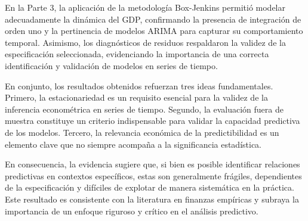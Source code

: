 \documentclass[11pt,a4paper]{article}
\begin{document}
	En la Parte 3, la aplicación de la metodología Box-Jenkins permitió modelar adecuadamente la dinámica del GDP, confirmando la presencia de integración de orden uno y la pertinencia de modelos ARIMA para capturar su comportamiento temporal. Asimismo, los diagnósticos de residuos respaldaron la validez de la especificación seleccionada, evidenciando la importancia de una correcta identificación y validación de modelos en series de tiempo.
	
	En conjunto, los resultados obtenidos refuerzan tres ideas fundamentales. Primero, la estacionariedad es un requisito esencial para la validez de la inferencia econométrica en series de tiempo. Segundo, la evaluación fuera de muestra constituye un criterio indispensable para validar la capacidad predictiva de los modelos. Tercero, la relevancia económica de la predictibilidad es un elemento clave que no siempre acompaña a la significancia estadística.
	
	En consecuencia, la evidencia sugiere que, si bien es posible identificar relaciones predictivas en contextos específicos, estas son generalmente frágiles, dependientes de la especificación y difíciles de explotar de manera sistemática en la práctica. Este resultado es consistente con la literatura en finanzas empíricas y subraya la importancia de un enfoque riguroso y crítico en el análisis predictivo.

	
\end{document}
